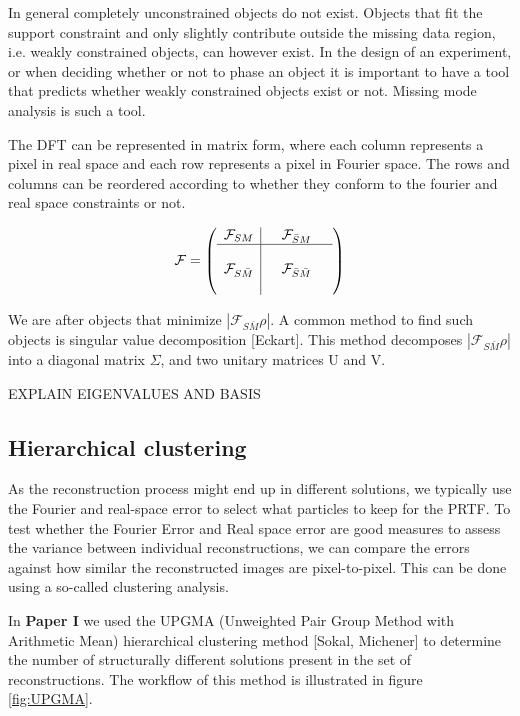 In general completely unconstrained objects do not exist. Objects that fit the support constraint and only slightly contribute outside the missing data region, i.e. weakly constrained objects, can however exist. In the design of an experiment, or when deciding whether or not to phase an object it is important to have a tool that predicts whether weakly constrained objects exist or not. Missing mode analysis is such a tool.

The DFT can be represented in matrix form, where each column represents a pixel in real space and each row represents a pixel in Fourier space. The rows and columns can be reordered according to whether they conform to the fourier and real space constraints or not.

\begin{equation}\label{equ:F_split}
  \mathcal{F} = 
  \left(\begin{array}{l|lll}
    \mathcal{F}_{SM} & &\mathcal{F}_{\bar{S}M}& \\\hline
    &&&\\
    \mathcal{F}_{S\bar{M}} & & \mathcal{F}_{\bar{S}\bar{M}} &\\
    &&&
  \end{array}\right)
\end{equation}

We are after objects that minimize $|\mathcal{F}_{S\bar{M}}\rho|$. A common method to find such objects is singular value decomposition [Eckart]. This method decomposes $|\mathcal{F}_{S\bar{M}}\rho|$ into a diagonal matrix $\Sigma$, and two unitary matrices U and V.



EXPLAIN EIGENVALUES AND BASIS




\subsection{Hierarchical clustering}
As the reconstruction process might end up in different solutions, we typically use the Fourier and real-space error to select what particles to keep for the PRTF. To test whether the Fourier Error and Real space error are good measures to assess the variance between individual reconstructions, we can compare the errors against how similar the reconstructed images are pixel-to-pixel. This can be done using a so-called clustering analysis. 

In \textbf{Paper I} we used the  UPGMA (Unweighted Pair Group Method with Arithmetic Mean) hierarchical clustering method [Sokal, Michener] to determine the number of structurally different solutions present in the set of reconstructions. The workflow of this method is illustrated in figure \ref{fig:UPGMA}.

